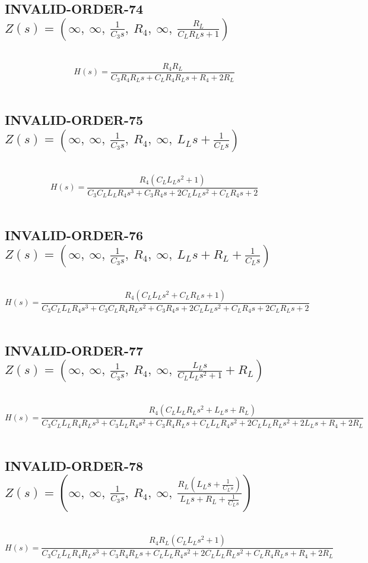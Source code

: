 \documentclass{article}
\begin{document}
\subsection{INVALID-ORDER-74 $Z(s) = \left( \infty, \  \infty, \  \frac{1}{C_{3} s}, \  R_{4}, \  \infty, \  \frac{R_{L}}{C_{L} R_{L} s + 1}\right)$ } \ 
\textbf{\[H(s) = \frac{R_{4} R_{L}}{C_{3} R_{4} R_{L} s + C_{L} R_{4} R_{L} s + R_{4} + 2 R_{L}}\] } \ 
\subsection{INVALID-ORDER-75 $Z(s) = \left( \infty, \  \infty, \  \frac{1}{C_{3} s}, \  R_{4}, \  \infty, \  L_{L} s + \frac{1}{C_{L} s}\right)$ } \ 
\textbf{\[H(s) = \frac{R_{4} \left(C_{L} L_{L} s^{2} + 1\right)}{C_{3} C_{L} L_{L} R_{4} s^{3} + C_{3} R_{4} s + 2 C_{L} L_{L} s^{2} + C_{L} R_{4} s + 2}\] } \ 
\subsection{INVALID-ORDER-76 $Z(s) = \left( \infty, \  \infty, \  \frac{1}{C_{3} s}, \  R_{4}, \  \infty, \  L_{L} s + R_{L} + \frac{1}{C_{L} s}\right)$ } \ 
\textbf{\[H(s) = \frac{R_{4} \left(C_{L} L_{L} s^{2} + C_{L} R_{L} s + 1\right)}{C_{3} C_{L} L_{L} R_{4} s^{3} + C_{3} C_{L} R_{4} R_{L} s^{2} + C_{3} R_{4} s + 2 C_{L} L_{L} s^{2} + C_{L} R_{4} s + 2 C_{L} R_{L} s + 2}\] } \ 
\subsection{INVALID-ORDER-77 $Z(s) = \left( \infty, \  \infty, \  \frac{1}{C_{3} s}, \  R_{4}, \  \infty, \  \frac{L_{L} s}{C_{L} L_{L} s^{2} + 1} + R_{L}\right)$ } \ 
\textbf{\[H(s) = \frac{R_{4} \left(C_{L} L_{L} R_{L} s^{2} + L_{L} s + R_{L}\right)}{C_{3} C_{L} L_{L} R_{4} R_{L} s^{3} + C_{3} L_{L} R_{4} s^{2} + C_{3} R_{4} R_{L} s + C_{L} L_{L} R_{4} s^{2} + 2 C_{L} L_{L} R_{L} s^{2} + 2 L_{L} s + R_{4} + 2 R_{L}}\] } \ 
\subsection{INVALID-ORDER-78 $Z(s) = \left( \infty, \  \infty, \  \frac{1}{C_{3} s}, \  R_{4}, \  \infty, \  \frac{R_{L} \left(L_{L} s + \frac{1}{C_{L} s}\right)}{L_{L} s + R_{L} + \frac{1}{C_{L} s}}\right)$ } \ 
\textbf{\[H(s) = \frac{R_{4} R_{L} \left(C_{L} L_{L} s^{2} + 1\right)}{C_{3} C_{L} L_{L} R_{4} R_{L} s^{3} + C_{3} R_{4} R_{L} s + C_{L} L_{L} R_{4} s^{2} + 2 C_{L} L_{L} R_{L} s^{2} + C_{L} R_{4} R_{L} s + R_{4} + 2 R_{L}}\] } \ 
\end{document}
